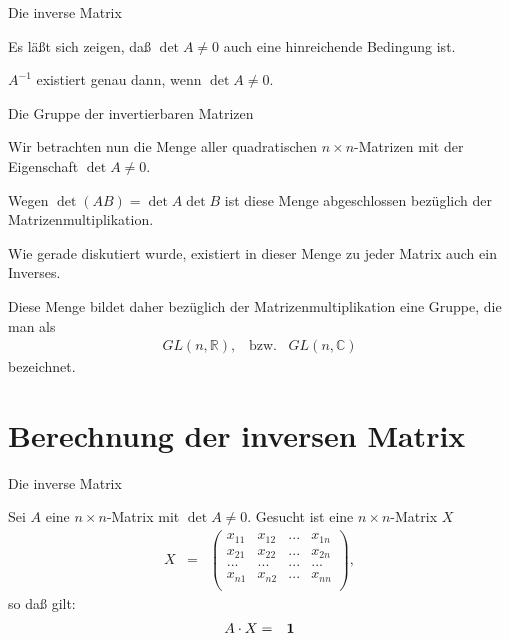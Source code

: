 \documentclass[german]{beamer}
\newcommand{\bq}{\begin{eqnarray*}}
\newcommand{\eq}{\end{eqnarray*}}
\begin{document}
\begin{frame}{Die inverse Matrix}

Es l\"a{\ss}t sich zeigen, da{\ss} $\det A \neq 0$ 
auch eine hinreichende Bedingung ist.

\begin{theorem}
$A^{-1}$ existiert genau dann, wenn $\det A \neq 0$.
\end{theorem}

\end{frame}

\begin{frame}{Die Gruppe der invertierbaren Matrizen}

Wir betrachten nun die Menge aller quadratischen $n \times n$-Matrizen mit der Eigenschaft $\det A \neq 0$.

Wegen $\det(A B) = \det A \det B$ ist diese Menge abgeschlossen bez\"uglich der Matrizenmultiplikation.

Wie gerade diskutiert wurde, existiert in dieser Menge zu jeder Matrix auch ein Inverses.

Diese Menge bildet daher bez\"uglich der Matrizenmultiplikation eine Gruppe, die man als
\bq
 GL\left(n,{\mathbb R}\right),
\;\;\;\mbox{bzw.}\;\;\;
 GL\left(n,{\mathbb C}\right)
\eq
bezeichnet.

\end{frame}


\section{Berechnung der inversen Matrix}

\frame{\sectionpage}

\begin{frame}{Die inverse Matrix}

Sei $A$ eine $n \times n$-Matrix mit $\det A \neq 0$. Gesucht ist eine $n \times n$-Matrix $X$
\bq
 X & = & 
\left( \begin{array}{cccc}
 x_{11} & x_{12} & ... & x_{1n} \\
 x_{21} & x_{22} & ... & x_{2n} \\
 ...    & ...    & ... & ...    \\
 x_{n1} & x_{n2} & ... & x_{nn} \\
\end{array} \right),
\eq
so da{\ss} gilt:
\bq
 A \cdot X & = & {\bf 1}
\eq

\end{frame}
\end{document}
